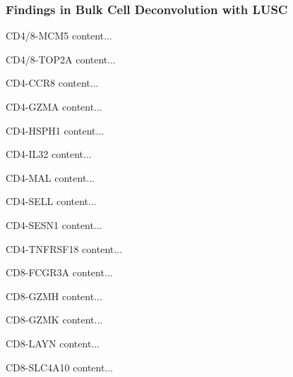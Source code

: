 \documentclass{beamer}
\begin{document}
    \begin{frame}[allowframebreaks]
        \frametitle{Findings in Bulk Cell Deconvolution with LUSC}

        \begin{block}{CD4/8-MCM5}
            content...
        \end{block}

        \begin{block}{CD4/8-TOP2A}
            content...
        \end{block}

        \begin{block}{CD4-CCR8}
            content...
        \end{block}

        \begin{block}{CD4-GZMA}
            content...
        \end{block}

        \begin{block}{CD4-HSPH1}
            content...
        \end{block}

        \begin{block}{CD4-IL32}
            content...
        \end{block}

        \begin{block}{CD4-MAL}
            content...
        \end{block}

        \begin{block}{CD4-SELL}
            content...
        \end{block}

        \begin{block}{CD4-SESN1}
            content...
        \end{block}

        \begin{block}{CD4-TNFRSF18}
            content...
        \end{block}

        \begin{block}{CD8-FCGR3A}
            content...
        \end{block}

        \begin{block}{CD8-GZMH}
            content...
        \end{block}

        \begin{block}{CD8-GZMK}
            content...
        \end{block}

        \begin{block}{CD8-LAYN}
            content...
        \end{block}

        \begin{block}{CD8-SLC4A10}
            content...
        \end{block}
    \end{frame}
\end{document}
